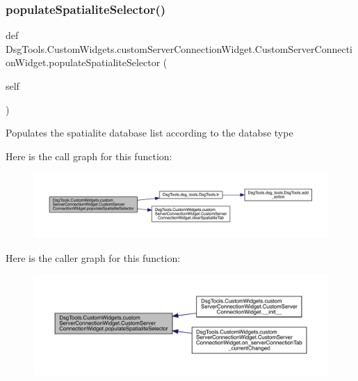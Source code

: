 \subsubsection{\texorpdfstring{populate\+Spatialite\+Selector()}{populateSpatialiteSelector()}}
{\footnotesize\ttfamily def Dsg\+Tools.\+Custom\+Widgets.\+custom\+Server\+Connection\+Widget.\+Custom\+Server\+Connection\+Widget.\+populate\+Spatialite\+Selector (\begin{DoxyParamCaption}\item[{}]{self }\end{DoxyParamCaption})}

\begin{DoxyVerb}Populates the spatialite database list according to the databse type
\end{DoxyVerb}
 Here is the call graph for this function\+:
\nopagebreak
\begin{figure}[H]
\begin{center}
\leavevmode
\includegraphics[width=350pt]{class_dsg_tools_1_1_custom_widgets_1_1custom_server_connection_widget_1_1_custom_server_connection_widget_a71cabf4c45973462d4b640dae4feb911_cgraph}
\end{center}
\end{figure}
Here is the caller graph for this function\+:
\nopagebreak
\begin{figure}[H]
\begin{center}
\leavevmode
\includegraphics[width=350pt]{class_dsg_tools_1_1_custom_widgets_1_1custom_server_connection_widget_1_1_custom_server_connection_widget_a71cabf4c45973462d4b640dae4feb911_icgraph}
\end{center}
\end{figure}
\mbox{\label{class_dsg_tools_1_1_custom_widgets_1_1custom_server_connection_widget_1_1_custom_server_connection_widget_a6292041487c522474161338a4394b0fc}} 
